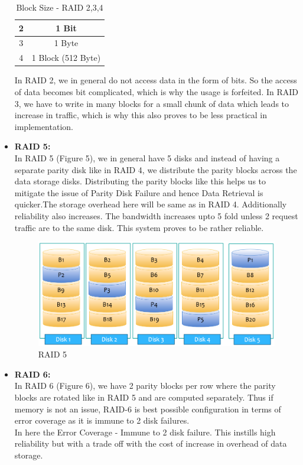 \documentclass[12pt]{article}
\begin{document}
\begin{itemize}
\begin{table}
\begin{tabular}{|c|c|}
    \hline
    2             & 1 Bit                \\ 
    \hline
    3             & 1 Byte               \\ 
    \hline
    4             & 1 Block (512 Byte)   \\
    \hline
    \end{tabular}
    \caption{Block Size - RAID 2,3,4}
    \end{table}
    In RAID 2, we in general do not access data in the form of bits. So the access of data becomes bit complicated, which is why the usage is forfeited. In RAID 3, we have to write in many blocks for a small chunk of data which leads to increase in traffic, which is why this also proves to be less practical in implementation.
    
    \item \textbf{RAID 5:} \\
    In RAID 5 (Figure 5), we in general have 5 disks and instead of having a separate parity disk like in RAID 4, we distribute the parity blocks across the data storage disks. Distributing the parity blocks like this helps us to mitigate the issue of Parity Disk Failure and hence Data Retrieval is quicker.The storage overhead here will be same as in RAID 4. Additionally reliability also increases. The bandwidth increases upto 5 fold unless 2 request traffic are to the same disk. This system proves to be rather reliable.
    \begin{figure}
        \centering
        \includegraphics[width=15cm]{Assignment-14/Raid_5.png}
        \caption{RAID 5}
    \end{figure}
    
    
    \item \textbf{RAID 6:} \\
    In RAID 6 (Figure 6), we have 2 parity blocks per row where the parity blocks are rotated like in RAID 5 and are computed separately. Thus if memory is not an issue, RAID-6 is best possible configuration in terms of error coverage as it is immune to 2 disk failures.\\
    In here the Error Coverage - Immune to 2 disk failure. This instills high reliability but with a trade off with the cost of increase in overhead of  data storage.
    

\end{itemize}
\end{document}
